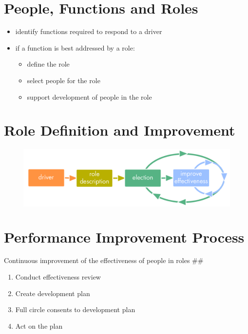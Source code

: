 \section{People, Functions and Roles}
\label{peoplefunctionsandroles}

\begin{itemize}
\item identify functions required to respond to a driver

\item if a function is best addressed by a role:

\begin{itemize}
\item define the role

\item select people for the role

\item support development of people in the role

\end{itemize}

\end{itemize}

\section{Role Definition and Improvement}
\label{roledefinitionandimprovement}

\begin{figure}[htbp]
\centering
\includegraphics[keepaspectratio,width=\textwidth,height=0.75\textheight]{img/people-and-roles/role-improvement.png}
\end{figure}

\section{Performance Improvement Process}
\label{performanceimprovementprocess}

Continuous improvement of the effectiveness of people in roles \#\#

\begin{enumerate}
\item Conduct effectiveness review

\item Create development plan

\item Full circle consents to development plan

\item Act on the plan

\end{enumerate}

